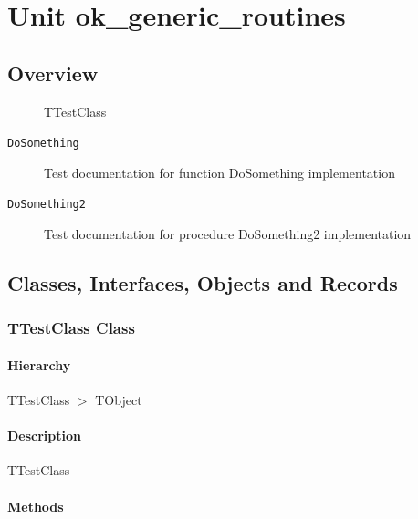 \documentclass{report}
\newif\ifpdf
\begin{document}
\label{toc}\tableofcontents
\newpage
\newlength{\tmplength}
\chapter{Unit ok{\_}generic{\_}routines}
\label{ok_generic_routines}
\section{Overview}
\begin{description}
\item[\texttt{\begin{ttfamily}TTestClass\end{ttfamily} Class}]TTestClass
\end{description}
\begin{description}
\item[\texttt{DoSomething}]Test documentation for function DoSomething implementation
\item[\texttt{DoSomething2}]Test documentation for procedure DoSomething2 implementation
\end{description}
\section{Classes, Interfaces, Objects and Records}
\ifpdf
\subsection*{\large{\textbf{TTestClass Class}}\normalsize\hspace{1ex}\hrulefill}
\else
\subsection*{TTestClass Class}
\fi
\label{ok_generic_routines.TTestClass}
\subsubsection*{\large{\textbf{Hierarchy}}\normalsize\hspace{1ex}\hfill}
TTestClass {$>$} TObject
\subsubsection*{\large{\textbf{Description}}\normalsize\hspace{1ex}\hfill}
TTestClass\subsubsection*{\large{\textbf{Methods}}\normalsize\hspace{1ex}\hfill}
\end{document}
